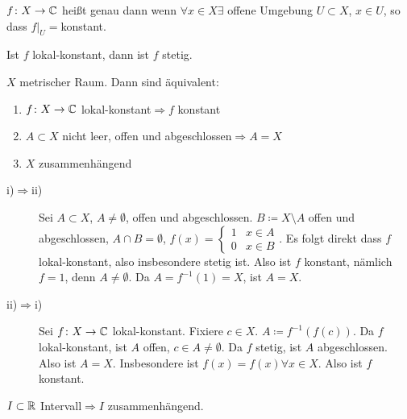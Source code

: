 \begin{definition}
	$ f\colon X\rightarrow\mathbb{C} $ hei\ss t  genau dann wenn $ \forall x\in X\exists $ offene Umgebung $ U\subset X $, $ x\in U $, so dass $ f|_U= $konstant.
\end{definition}
Ist $ f $ lokal-konstant, dann ist $ f $ stetig.\\
\begin{satz}
	$ X $ metrischer Raum. Dann sind \"aquivalent:\begin{enumerate}
		\item $ f\colon X\rightarrow\mathbb{C} $ lokal-konstant$ \Rightarrow f$ konstant
		\item $ A\subset X $ nicht leer, offen und abgeschlossen$ \Rightarrow A=X $
		\item $ X $ zusammenh\"angend
	\end{enumerate}
\end{satz}
\newpage
\begin{beweis}
	\begin{description}
		\item[i)$ \Rightarrow $ii)] Sei $ A\subset X $, $ A\neq\emptyset $, offen und abgeschlossen. $ B\coloneqq X\setminus A $ offen und abgeschlossen, $ A\cap B=\emptyset $, $ f(x)= \begin{cases}
		1&x\in A\\0&x\in B
		\end{cases} $. Es folgt direkt dass $ f $ lokal-konstant, also insbesondere stetig ist. Also ist $ f $ konstant, n\"amlich $ f=1 $, denn $ A\neq\emptyset $. Da $ A=f^{-1}(1)=X $, ist $ A=X $.
		\item[ii)$ \Rightarrow $i)] Sei $ f\colon X\rightarrow\mathbb{C} $ lokal-konstant. Fixiere $ c\in X $. $ A\coloneqq f^{-1}(f(c)) $. Da $ f $ lokal-konstant, ist $ A $ offen, $ c\in A\neq\emptyset $. Da $ f $ stetig, ist $ A $ abgeschlossen. Also ist $ A=X $. Insbesondere ist $ f(x)=f(x)\forall x\in X $. Also ist $ f $ konstant.
	\end{description}
\end{beweis}
\begin{satz}
	$ I\subset\mathbb{R} $ Intervall$ \Rightarrow I $ zusammenh\"angend.
\end{satz}
